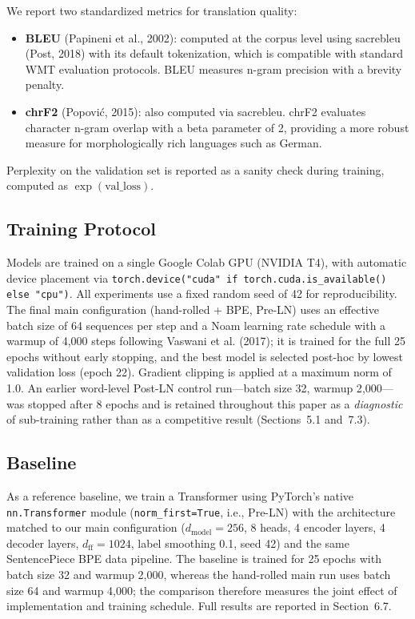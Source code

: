 We report two standardized metrics for translation quality:

\begin{itemize}
\item \textbf{BLEU} (Papineni et al., 2002): computed at the corpus level using sacrebleu (Post, 2018) with its default tokenization, which is compatible with standard WMT evaluation protocols. BLEU measures n-gram precision with a brevity penalty.
\item \textbf{chrF2} (Popovi\'c, 2015): also computed via sacrebleu. chrF2 evaluates character n-gram overlap with a beta parameter of 2, providing a more robust measure for morphologically rich languages such as German.
\end{itemize}

Perplexity on the validation set is reported as a sanity check during training, computed as $\exp(\text{val\_loss})$.

\subsection{Training Protocol}

Models are trained on a single Google Colab GPU (NVIDIA T4), with automatic device placement via \texttt{torch.device("cuda" if torch.cuda.is\_available() else "cpu")}. All experiments use a fixed random seed of 42 for reproducibility. The final main configuration (hand-rolled + BPE, Pre-LN) uses an effective batch size of 64 sequences per step and a Noam learning rate schedule with a warmup of 4{,}000 steps following Vaswani et al. (2017); it is trained for the full 25 epochs without early stopping, and the best model is selected post-hoc by lowest validation loss (epoch 22). Gradient clipping is applied at a maximum norm of 1.0. An earlier word-level Post-LN control run---batch size 32, warmup 2{,}000---was stopped after 8 epochs and is retained throughout this paper as a \textit{diagnostic} of sub-training rather than as a competitive result (Sections~5.1 and~7.3).

\subsection{Baseline}

As a reference baseline, we train a Transformer using PyTorch's native \texttt{nn.Transformer} module (\texttt{norm\_first=True}, i.e., Pre-LN) with the architecture matched to our main configuration ($d_{\text{model}}=256$, 8 heads, 4 encoder layers, 4 decoder layers, $d_{\text{ff}}=1024$, label smoothing 0.1, seed 42) and the same SentencePiece BPE data pipeline. The baseline is trained for 25 epochs with batch size 32 and warmup 2{,}000, whereas the hand-rolled main run uses batch size 64 and warmup 4{,}000; the comparison therefore measures the joint effect of implementation and training schedule. Full results are reported in Section~6.7.

